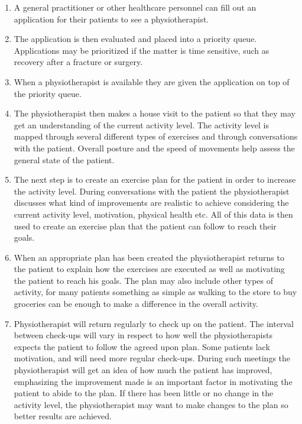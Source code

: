 \vspace{-4mm}
\begin{enumerate}
  \item A general practitioner or other healthcare personnel can fill out an application for their patients to see a physiotherapist.
  \item The application is then evaluated and placed into a priority queue. Applications may be prioritized if the matter is time sensitive, such as recovery after a fracture or surgery.
  \item When a physiotherapist is available they are given the application on top of the priority queue.
  \item The physiotherapist then makes a house visit to the patient so that they may get an understanding of the current activity level. The activity level is mapped through several different types of exercises and through conversations with the patient. Overall posture and the speed of movements help assess the general state of the patient.
  \item The next step is to create an exercise plan for the patient in order to increase the activity level. During conversations with the patient the physiotherapist discusses what kind of improvements are realistic to achieve considering the current activity level, motivation, physical health etc. All of this data is then used to create an exercise plan that the patient can follow to reach their goals.
  \item When an appropriate plan has been created the physiotherapist returns to the patient to explain how the exercises are executed as well as motivating the patient to reach his goals. The plan may also include other types of activity, for many patients something as simple as walking to the store to buy groceries can be enough to make a difference in the overall activity.
  \item Physiotherapist will return regularly to check up on the patient. The interval between check-ups will vary in respect to how well the physiotherapists expects the patient to follow the agreed upon plan. Some patients lack motivation, and will need more regular check-ups. During such meetings the physiotherapist will get an idea of how much the patient has improved, emphasizing the improvement made is an important factor in motivating the patient to abide to the plan. If there has been little or no change in the activity level, the physiotherapist may want to make changes to the plan so better results are achieved.
\end{enumerate}
